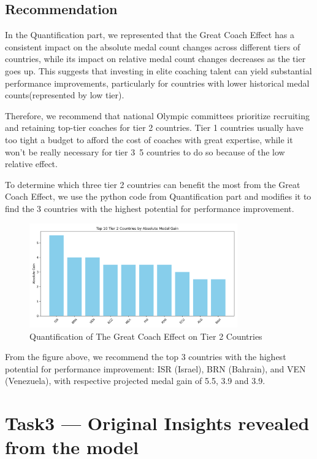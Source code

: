 \documentclass{mcmthesis}
\begin{document}
\subsection{Recommendation}

In the Quantification part, we represented that the Great Coach Effect has a consistent impact on the absolute medal count changes across different tiers of countries, while its impact on relative medal count changes decreases as the tier goes up. This suggests that investing in elite coaching talent can yield substantial performance improvements, particularly for countries with lower historical medal counts(represented by low tier).

Therefore, we recommend that national Olympic committees prioritize recruiting and retaining top-tier coaches for tier 2 countries. Tier 1 countries usually have too tight a budget to afford the cost of coaches with great expertise, while it won't be really necessary for tier 3~5 countries to do so because of the low relative effect.

To determine which three tier 2 countries can benefit the most from the Great Coach Effect, we use the python code from Quantification part and modifies it to find the 3 countries with the highest potential for performance improvement. 

\begin{figure}[htbp]
    \centering
    \includegraphics[width=0.8\textwidth]{pics/tier2_top10_absolute_gain.png}
    \caption{Quantification of The Great Coach Effect on Tier 2 Countries}
\end{figure}

From the figure above, we recommend the top 3 countries with the highest potential for performance improvement: ISR (Israel), BRN (Bahrain), and VEN (Venezuela), with respective projected medal gain of 5.5, 3.9 and 3.9.


\section{Task3 --- Original Insights revealed from the model}
\end{document}
